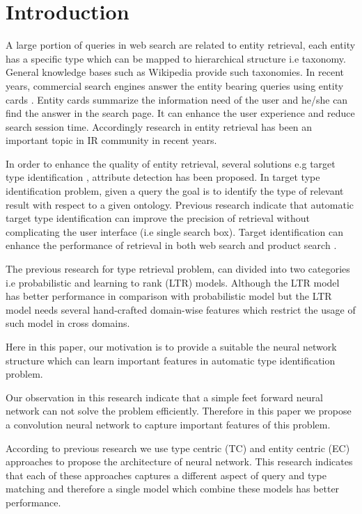 \section{Introduction}\label{introduction}
\par
A large portion of queries in web search are related to entity retrieval, each entity has a specific type which can be mapped to hierarchical structure i.e taxonomy. General knowledge bases such as Wikipedia provide such taxonomies. In recent years, commercial search engines answer the entity bearing queries using entity cards \cite{}. Entity cards summarize the information need of the user and he/she can find the answer in the search page. It can enhance the user experience and reduce search session time. Accordingly research in entity retrieval has been an important topic in IR community in recent years.
\par
In order to enhance the quality of entity retrieval, several solutions e.g target type identification \cite{}, attribute detection \cite{} has been proposed. In target type identification problem,  given a query the goal is to identify the type of relevant result with respect to a given ontology. Previous research indicate that automatic target type identification can improve the precision of retrieval without complicating the user interface (i.e single search box). Target identification can enhance the performance of retrieval in both web search and product search \cite{}.
\par
The previous research for type retrieval problem, can divided into two categories i.e probabilistic and learning to rank (LTR) models. Although the LTR model has better performance in comparison with probabilistic model but the LTR model needs several hand-crafted domain-wise features which restrict the usage of such model in cross domains.

Here in this paper, our motivation is to provide a suitable the neural network structure which can learn important features in automatic type identification problem.

Our observation in this research indicate that a simple feet forward neural network can not solve the problem efficiently. Therefore in this paper we propose a convolution neural network to capture important features of this problem. 

According to previous research we use type centric (TC) and entity centric (EC) approaches to propose the architecture of neural network. This research indicates that each of these approaches captures a different aspect of query and type matching and therefore a single model which combine these models has better performance.

